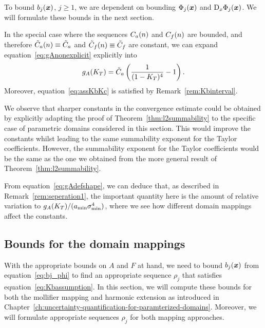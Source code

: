 To bound $b_j({{\bm{x}}})$, $j \geq 1$, we are dependent on bounding $\Phi_j({{\bm{x}}})$ and $\mathop{}\!\mathrm{D}_x\Phi_j({{\bm{x}}})$.
We will formulate these bounds in the next section.

\begin{remark}
    In the special case where the sequences ${{C}_a}(n)$ and ${{C}_f}(n)$ are bounded, and therefore ${\tilde{C}_a}(n)\equiv {\tilde{C}_a}$ and ${\tilde{C}_f}(n)\equiv{\tilde{C}_f}$ are constant, we can expand equation~\eqref{eq:gAnonexplicit} explicitly into
    \begin{align*}
        g_A(K_T) = {\tilde{C}_a} \left( \frac{1}{(1-K_T)^4} -1\right).
    \end{align*}
    Moreover, equation~\eqref{eq:assKbKc} is satisfied by Remark~\ref{rem:Kbinterval}.
\end{remark}
\begin{remark}
    We observe that sharper constants in the convergence estimate could be obtained by explicitly adapting the proof of Theorem~\ref{thm:l2summability} to the specific case of parametric domains considered in this section.
    This would improve the constants whilst leading to the same summability exponent for the Taylor coefficients.
    However, the summability exponent for the Taylor coefficients would be the same as the one we obtained from the more general result of Theorem~\ref{thm:l2summability}.
\end{remark}
\begin{remark}
    From equation~\eqref{eq:gAdefshape}, we can deduce that, as described in Remark~\ref{rem:seperation1}, the important quantity here is the amount of relative variation to $g_A(K_T)/(a_{\min}\sigma_{\min}^4)$, where we see how different domain mappings affect the constants.
\end{remark}

\subsection{Bounds for the domain mappings}\label{subsec:transformation-methods}
With the appropriate bounds on $A$ and $F$ at hand, we need to bound $b_j({{\bm{x}}})$ from equation~\eqref{eq:bj_phi} to find an appropriate sequence $\rho_j$ that satisfies equation~\eqref{eq:Kbassumption}.
In this section, we will compute these bounds for both the mollifier mapping and harmonic extension as introduced in Chapter~\ref{ch:uncertainty-quantification-for-paramterized-domains}.
Moreover, we will formulate appropriate sequences $\rho_j$ for both mapping approaches.

